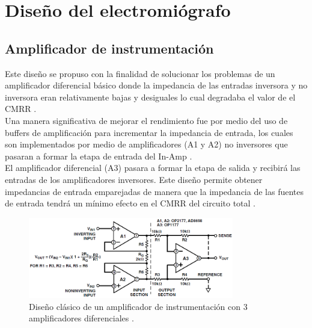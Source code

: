 \chapter{Diseño del electromiógrafo} 
\section{Amplificador de instrumentación}
Este diseño se propuso con la finalidad de solucionar los problemas de un amplificador diferencial básico donde la impedancia de las entradas inversora y no inversora eran relativamente bajas y desiguales lo cual degradaba el valor de el CMRR \cite{kitchin2006designer}.\\

Una manera significativa de mejorar el rendimiento fue por medio del uso de buffers de amplificación para incrementar la impedancia de entrada, los cuales son implementados por medio de amplificadores (A1 y A2) no inversores que pasaran a formar la etapa de entrada del In-Amp \cite{kitchin2006designer}.\\

El amplificador diferencial (A3) pasara a formar la etapa de salida y recibirá las entradas de los amplificadores inversores. Este diseño permite obtener impedancias de entrada emparejadas de manera que la impedancia de las fuentes de entrada tendrá un mínimo efecto en el CMRR del circuito total \cite{kitchin2006designer}.



\begin{figure}[H]
  \centering
  \includegraphics[width=0.8\textwidth]{Capitulo_2/Amplificador_instrumentacion.png}
  \caption{Diseño clásico de un amplificador de instrumentación con 3 amplificadores diferenciales \cite{kitchin2006designer}.}
  \label{amp instrumentacion clasico} 
\end{figure}


